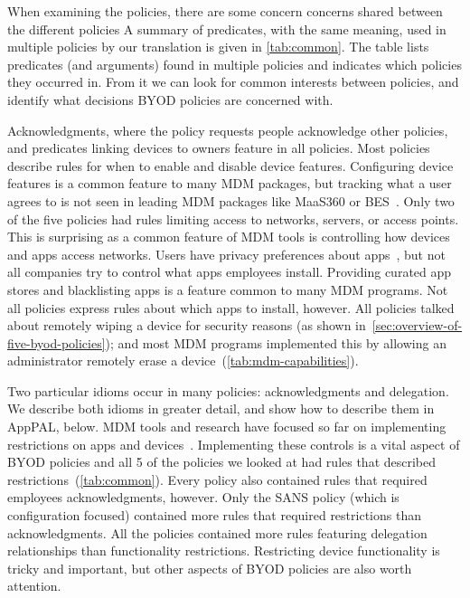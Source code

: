 \documentclass[thesis.tex]{subfiles}
\begin{document}
When examining the policies, there are some concern concerns shared
between the different policies A summary of predicates, with the same
meaning, used in multiple policies by our translation is given in
\autoref{tab:common}.  The table lists predicates (and arguments)
found in multiple policies and indicates which policies they occurred
in.  From it we can look for common interests between policies, and
identify what decisions \ac{BYOD} policies are concerned with.

Acknowledgments, where the policy requests people acknowledge other
policies, and predicates linking devices to owners feature in all
policies.  Most policies describe rules for when to enable and disable
device features.  Configuring device features is a common feature to
many \ac{MDM} packages, but tracking what a user agrees to is not seen
in leading \ac{MDM} packages like MaaS360 or
BES~\cite{rob_smith_magic_2016}.  Only two of the five policies had
rules limiting access to networks, servers, or access points. This is
surprising as a common feature of \ac{MDM} tools is controlling how
devices and apps access networks.  Users have privacy preferences
about apps~\cite{lin_modeling_2014}, but not all companies try to
control what apps employees install.  Providing curated app stores and
blacklisting apps is a feature common to many \ac{MDM} programs.  Not
all policies express rules about which apps to install, however.  All
policies talked about remotely wiping a device for security reasons
(as shown in~\autoref{sec:overview-of-five-byod-policies}); and most
\ac{MDM} programs implemented this by allowing an administrator
remotely erase a device~(\autoref{tab:mdm-capabilities}).

Two particular idioms occur in many policies: acknowledgments and
delegation.  We describe both idioms in greater detail, and show how
to describe them in AppPAL, below.  MDM tools and research have
focused so far on implementing restrictions on apps and
devices~\cite{ibm_ibm_nodate,armando_formal_2014,martinelli_enhancing_2016}.
Implementing these controls is a vital aspect of BYOD policies and all
5 of the policies we looked at had rules that described
restrictions~(\autoref{tab:common}).  Every policy also contained
rules that required employees acknowledgments, however.  Only the
SANS policy (which is configuration focused) contained more rules
that required restrictions than acknowledgments.  All the policies
contained more rules featuring delegation relationships than
functionality restrictions.  Restricting device functionality is
tricky and important, but other aspects of BYOD policies are also
worth attention.
\end{document}
